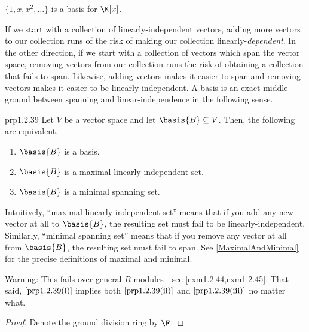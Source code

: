 \begin{exm}{}{}
	$\{ 1,x,x^2,\ldots \}$ is a basis for $\K [x]$.
\end{exm}

If we start with a collection of linearly-independent vectors, adding more vectors to our collection runs of the risk of making our collection linearly-\emph{dependent}.  In the other direction, if we start with a collection of vectors which span the vector space, removing vectors from our collection runs the risk of obtaining a collection that fails to span.  Likewise, adding vectors makes it easier to span and removing vectors makes it easier to be linearly-independent.  A basis is an exact middle ground between spanning and linear-independence in the following sense.
\begin{prp}{}{prp1.2.39}
	Let $V$ be a vector space and let $\basis{B}\subseteq V$.  Then, the following are equivalent.
	\begin{enumerate}
		\item \label{prp1.2.39(i)}$\basis{B}$ is a basis.
		\item \label{prp1.2.39(ii)}$\basis{B}$ is a maximal linearly-independent set.
		\item \label{prp1.2.39(iii)}$\basis{B}$ is a minimal spanning set.
	\end{enumerate}
	\begin{rmk}
		Intuitively, ``maximal linearly-independent set'' means that if you add any new vector at all to $\basis{B}$, the resulting set must fail to be linearly-independent.  Similarly, ``minimal spanning set'' means that if you remove any vector at all from $\basis{B}$, the resulting set must fail to span.  See \cref{MaximalAndMinimal} for the precise definitions of maximal and minimal.
	\end{rmk}
	\begin{rmk}
		Warning:  This fails over general $R$-modules---see \cref{exm1.2.44,exm1.2.45}.  That said, $\cref{prp1.2.39(i)}$ implies both $\cref{prp1.2.39(ii)}$ and $\cref{prp1.2.39(iii)}$ no matter what.
	\end{rmk}
	\begin{proof}
		Denote the ground division ring by $\F$.
		

\end{proof}
\end{prp}

